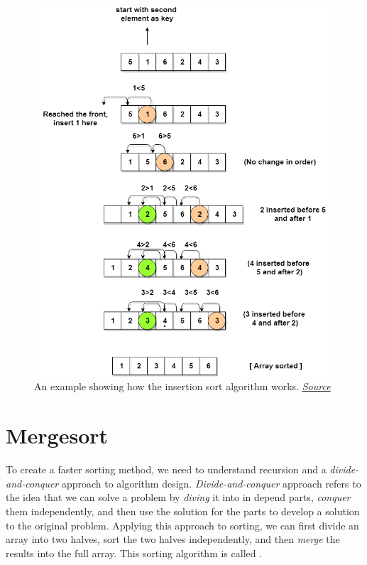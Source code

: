 \begin{figure}
    \centering
    \includegraphics[width=\textwidth]{lectures/images/insertion-sort.png}
    \caption{An example showing how the insertion sort algorithm works. \href{https://vivaharsha.com/product/verilog-implementation-of-insertion-sort-16-bits-and-5-inputs/}{\textit{Source}}}
    \label{fig:insertion_sort}
\end{figure}


\section{Mergesort}
To create a faster sorting method, we need to understand recursion and a \textit{divide-and-conquer} approach to algorithm design. \textit{Divide-and-conquer} approach refers to the idea that we can solve a problem by \textit{diving} it into in depend parts, \textit{conquer} them independently, and then use the solution for the parts to develop a solution to the original problem. Applying this approach to sorting, we can first divide an array into two halves, sort the two halves independently, and then \textit{merge} the results into the full array. This sorting algorithm is called . 


